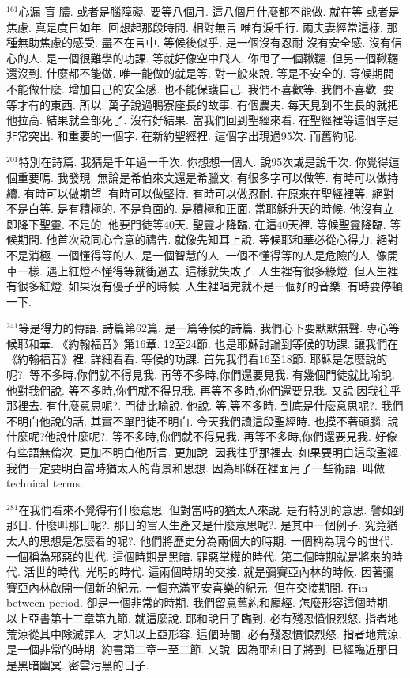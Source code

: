 \documentclass{book}
\begin{document}
$^{161}$心漏 盲 膿.
或者是腦障礙.
要等八個月.
這八個月什麼都不能做.
就在等 或者是焦慮.
真是度日如年.
回想起那段時間.
相對無言 唯有淚千行.
兩夫妻經常這樣.
那種無助焦慮的感受.
盡不在言中.
等候後似乎.
是一個沒有忍耐 沒有安全感.
沒有信心的人.
是一個很難學的功課.
等就好像空中飛人.
你甩了一個鞦韆.
但另一個鞦韆還沒到.
什麼都不能做.
唯一能做的就是等.
對一般來說.
等是不安全的.
等候期間不能做什麼.
增加自己的安全感.
也不能保護自己.
我們不喜歡等.
我們不喜歡.
要等才有的東西.
所以.
萬子說過鴨寮座長的故事.
有個農夫.
每天見到不生長的就把他拉高.
結果就全部死了.
沒有好結果.
當我們回到聖經來看.
在聖經裡等這個字是非常突出.
和重要的一個字.
在新約聖經裡.
這個字出現過95次.
而舊約呢.

$^{201}$特別在詩篇.
我猜是千年過一千次.
你想想一個人.
說95次或是說千次.
你覺得這個重要嗎.
我發現.
無論是希伯來文還是希臘文.
有很多字可以做等.
有時可以做持續.
有時可以做期望.
有時可以做堅持.
有時可以做忍耐.
在原來在聖經裡等.
絕對不是白等.
是有積極的.
不是負面的.
是積極和正面.
當耶穌升天的時候.
他沒有立即降下聖靈.
不是的.
他要門徒等40天.
聖靈才降臨.
在這40天裡.
等候聖靈降臨.
等候期間.
他首次說同心合意的禱告.
就像先知耳上說.
等候耶和華必從心得力.
絕對不是消極.
一個懂得等的人.
是一個智慧的人.
一個不懂得等的人是危險的人.
像開車一樣.
遇上紅燈不懂得等就衝過去.
這樣就失敗了.
人生裡有很多綠燈.
但人生裡有很多紅燈.
如果沒有優子乎的時候.
人生裡唱完就不是一個好的音樂.
有時要停頓一下.

$^{241}$等是得力的傳語.
詩篇第62篇.
是一篇等候的詩篇.
我們心下要默默無聲.
專心等候耶和華.
《約翰福音》第16章.
12至24節.
也是耶穌討論到等候的功課.
讓我們在《約翰福音》裡.
詳細看看.
等候的功課.
首先我們看16至18節.
耶穌是怎麼說的呢?.
等不多時,你們就不得見我.
再等不多時,你們還要見我.
有幾個門徒就比喻說.
他對我們說.
等不多時,你們就不得見我.
再等不多時,你們還要見我.
又說:因我往乎那裡去.
有什麼意思呢?.
門徒比喻說.
他說.
等,等不多時.
到底是什麼意思呢?.
我們不明白他說的話.
其實不單門徒不明白.
今天我們讀這段聖經時.
也摸不著頭腦.
說什麼呢?他說什麼呢?.
等不多時,你們就不得見我.
再等不多時,你們還要見我.
好像有些語無倫次.
更加不明白他所言.
更加說.
因我往乎那裡去.
如果要明白這段聖經.
我們一定要明白當時猶太人的背景和思想.
因為耶穌在裡面用了一些術語.
叫做technical terms.

$^{281}$在我們看來不覺得有什麼意思.
但對當時的猶太人來說.
是有特別的意思.
譬如到那日.
什麼叫那日呢?.
那日的富人生產又是什麼意思呢?.
是其中一個例子.
究竟猶太人的思想是怎麼看的呢?.
他們將歷史分為兩個大的時期.
一個稱為現今的世代.
一個稱為邪惡的世代.
這個時期是黑暗.
罪惡掌權的時代.
第二個時期就是將來的時代.
活世的時代.
光明的時代.
這兩個時期的交接.
就是彌賽亞內林的時候.
因著彌賽亞內林啟開一個新的紀元.
一個充滿平安喜樂的紀元.
但在交接期間.
在in between period.
卻是一個非常的時期.
我們留意舊約和龐經.
怎麼形容這個時期.
以上亞書第十三章第九節.
就這麼說.
耶和說日子臨到.
必有殘忍憤恨烈怒.
指者地荒涼從其中除滅罪人.
才知以上亞形容.
這個時間.
必有殘忍憤恨烈怒.
指者地荒涼.
是一個非常的時期.
約書第二章一至二節.
又說.
因為耶和日子將到.
已經臨近那日是黑暗幽冥.
密雲污黑的日子.
\end{document}
